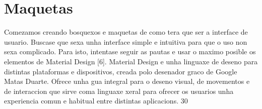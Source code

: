 \section{Maquetas}
Comezamos creando bosquexos e maquetas de como tera que ser a interface de usuario.
Buscase que sexa unha interface simple e intuitiva para que o uso non sexa complicado.
Para isto, intentase seguir as pautas e usar o maximo posible os elementos de Material
Design [6].
Material Design e unha linguaxe de deseno para distintas plataformas e dispositivos,
creada polo desenador graco de Google Matas Duarte. Ofrece unha gua integral para o
deseno visual, de movementos e de interaccion que sirve coma linguaxe xeral para ofrecer
os usuarios unha experiencia comun e habitual entre distintas aplicacions.
30

	
	
